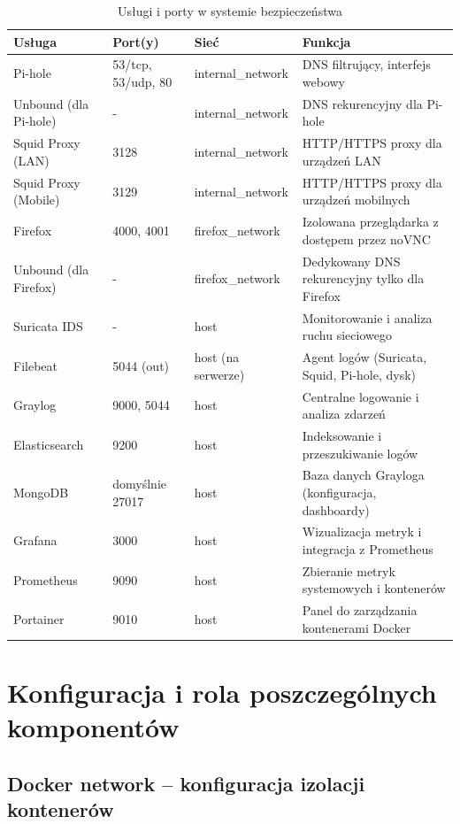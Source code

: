 \documentclass[
    left=2.5cm,         %
    right=2.5cm,        %
    top=2.5cm,          %
    bottom=3cm,         %
    bindingoffset=6mm,  %
    nohyphenation=true %
]{eiti/eiti-thesis} %
\begin{document}
\newpage
\begin{table}[H]
\centering
\caption{Usługi i porty w systemie bezpieczeństwa}
\label{tab:services-overview}
\begin{tabularx}{\textwidth}{|l|l|l|X|}
\hline
\textbf{Usługa} & \textbf{Port(y)} & \textbf{Sieć} & \textbf{Funkcja} \\
\hline
Pi-hole & 53/tcp, 53/udp, 80 & internal\_network & DNS filtrujący, interfejs webowy \\
\hline
Unbound (dla Pi-hole) & - & internal\_network & DNS rekurencyjny dla Pi-hole \\
\hline
Squid Proxy (LAN) & 3128 & internal\_network & HTTP/HTTPS proxy dla urządzeń LAN \\
\hline
Squid Proxy (Mobile) & 3129 & internal\_network & HTTP/HTTPS proxy dla urządzeń mobilnych \\
\hline
Firefox & 4000, 4001 & firefox\_network & Izolowana przeglądarka z dostępem przez noVNC \\
\hline
Unbound (dla Firefox) & - & firefox\_network & Dedykowany DNS rekurencyjny tylko dla Firefox \\
\hline
Suricata IDS & - & host & Monitorowanie i analiza ruchu sieciowego \\
\hline
Filebeat & 5044 (out) & host (na serwerze) & Agent logów (Suricata, Squid, Pi-hole, dysk) \\
\hline
Graylog & 9000, 5044 & host & Centralne logowanie i analiza zdarzeń \\
\hline
Elasticsearch & 9200 & host & Indeksowanie i przeszukiwanie logów \\
\hline
MongoDB & domyślnie 27017 & host & Baza danych Grayloga (konfiguracja, dashboardy) \\
\hline
Grafana & 3000 & host & Wizualizacja metryk i integracja z Prometheus \\
\hline
Prometheus & 9090 & host & Zbieranie metryk systemowych i kontenerów \\
\hline
Portainer & 9010 & host & Panel do zarządzania kontenerami Docker \\
\hline
\end{tabularx}
\end{table}


\newpage 
\section{Konfiguracja i rola poszczególnych komponentów}

\subsection{Docker network – konfiguracja izolacji kontenerów}
\end{document}
